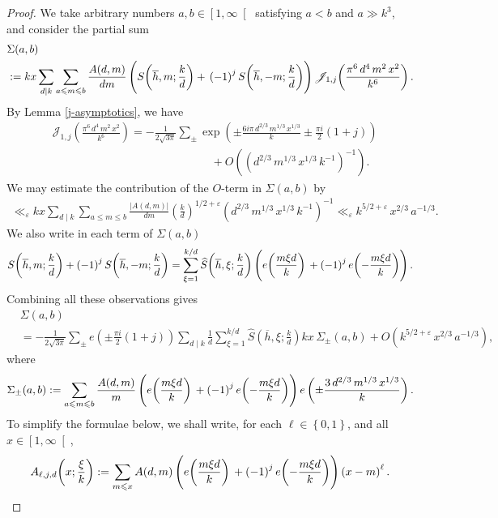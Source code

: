 \documentclass[a4paper,10pt,twoside]{amsart}
\theoremstyle{definition}
\numberwithin{equation}{section}
\newcommand\eps{\varepsilon}
\renewcommand\:{\colon}
\begin{document}
\begin{proof}
We take arbitrary numbers $a,b\in\left[1,\infty\right[$ satisfying $a<b$ and $a\gg k^{3}$, and consider the partial sum
\begin{align*}
&\Sigma(a,b)\\
&:=kx\sum_{d\mid k}\sum_{a\leqslant m\leqslant b}\frac{A(d,m)}{dm}\left(S\!\left(\overline h,m;\frac kd\right)+\vphantom{\Bigg|}\left(-1\right)^jS\!\left(\overline h,-m;\frac kd\right)\right)\mathscr J_{1,j}\!\left(\frac{\pi^6\,d^4\,m^2\,x^2}{k^6}\right).
\end{align*}
By Lemma \ref{j-asymptotics}, we have          
\begin{align*}
&\mathscr J_{1,j}\!\left(\frac{\pi^6\,d^4\,m^2\,x^2}{k^6}\right)
=-\frac{1}{2\sqrt{3\pi}}\sum_\pm\exp\!\left(\pm\frac{6i\pi\,d^{2/3}\,m^{1/3}\,x^{1/3}}k\pm\frac{\pi i}2\left(1+j\right)\right)\\
&\qquad\qquad\qquad\qquad\qquad\qquad\qquad+O\!\left(\left(d^{2/3}\,m^{1/3}\,x^{1/3}\,k^{-1}\right)^{-1}\right).
\end{align*}
We may estimate the contribution of the $O$-term in $\Sigma(a,b)$ by
\begin{align*}
\ll_\eps kx\sum_{d\mid k}\sum_{a\leqslant m\leqslant b}\frac{\left|A(d,m)\right|}{dm}\left(\frac kd\right)^{1/2+\varepsilon}\left(d^{2/3}\,m^{1/3}\,x^{1/3}\,k^{-1}\right)^{-1}
\ll_\eps k^{5/2+\varepsilon}\,x^{2/3}\,a^{-1/3}.
\end{align*}
We also write in each term of $\Sigma(a,b)$
\[S\!\left(\overline h,m;\frac kd\right)+\left(-1\right)^jS\!\left(\overline h,-m;\frac kd\right)
=\sum_{\xi=1}^{k/d}\widehat S\!\left(\overline h,\xi;\frac kd\right)\left(e\!\left(\frac{m\xi d}k\right)\vphantom{\Bigg|}+\left(-1\right)^je\!\left(-\frac{m\xi d}k\right)\right).\]
Combining all these observations gives
\begin{align*}
&\Sigma(a,b)\\
&=-\frac{1}{2\sqrt{3\pi}}\sum_\pm e\!\left(\pm\frac{\pi i }2\left(1+j\right)\right)\sum_{d\mid k}\frac1d\sum_{\xi=1}^{k/d}\widehat S\!\left(\overline h,\xi;\frac kd\right)
kx\,\Sigma_\pm(a,b)+O(k^{5/2+\varepsilon}\,x^{2/3}\,a^{-1/3}),
\end{align*}
where
\[
\Sigma_\pm(a,b):=\sum_{a\leqslant m\leqslant b}\frac{A(d,m)}m\left(e\!\left(\frac{m\xi d}k\right)\vphantom{\Bigg|}+\left(-1\right)^je\!\left(-\frac{m\xi d}k\right)\right) e\left(\pm\frac{3\,d^{2/3}\,m^{1/3}\,x^{1/3}}k\right).
\]
To simplify the formulae below, we shall write, for each $\ell\in\left\{0,1\right\}$, and all $x\in\left[1,\infty\right[$,
\[A_{\ell,j,d}\!\left(x;\frac \xi k\right):=\sum_{m\leqslant x}A(d,m)\left(e\!\left(\frac{m\xi d}k\right)\vphantom{\Bigg|}+\left(-1\right)^je\!\left(-\frac{m\xi d}k\right)\right)\left(x-m\right)^\ell.\]

\end{proof}
\end{document}
